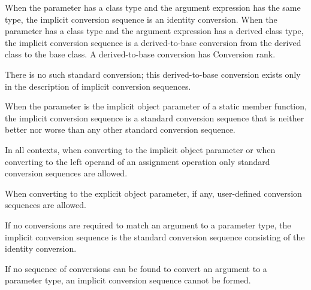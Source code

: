 \pnum
When the parameter has a class type and the argument expression has the
same type, the implicit conversion sequence is an identity conversion.
When the parameter has a class type and the argument expression has a
derived class type, the implicit conversion sequence is a
derived-to-base
%
conversion from the derived class to the base class.
A derived-to-base conversion has Conversion rank.
\begin{note}
There is no such standard conversion; this derived-to-base conversion exists
only in the description of implicit conversion sequences.
\end{note}

\pnum
When the parameter is the implicit object parameter of a static member function,
the implicit conversion sequence is a standard conversion sequence
that is neither better nor worse than any other standard conversion sequence.

\pnum
In all contexts, when converting to the implicit object parameter
or when converting to the left operand of an assignment operation
only standard conversion sequences are allowed.
\begin{note}
When converting to the explicit object parameter, if any,
user-defined conversion sequences are allowed.
\end{note}

\pnum
If no conversions are required to match an argument to a
parameter type, the implicit conversion sequence is the standard
conversion sequence consisting of the identity conversion.

\pnum
If no sequence of conversions can be found to convert an argument
to a parameter type, an implicit conversion sequence cannot be formed.

